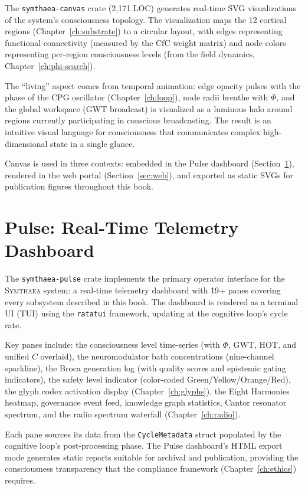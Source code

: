 \documentclass[12pt]{book}
\newcommand{\symthaea}{\textsc{Symthaea}}
\begin{document}
The \texttt{symthaea-canvas} crate (2,171 LOC) generates real-time SVG visualizations of the system's consciousness topology. The visualization maps the 12 cortical regions (Chapter~\ref{ch:substrate}) to a circular layout, with edges representing functional connectivity (measured by the CfC weight matrix) and node colors representing per-region consciousness levels (from the field dynamics, Chapter~\ref{ch:phi-search}).

The ``living'' aspect comes from temporal animation: edge opacity pulses with the phase of the CPG oscillator (Chapter~\ref{ch:loop}), node radii breathe with $\Phi$, and the global workspace (GWT broadcast) is visualized as a luminous halo around regions currently participating in conscious broadcasting. The result is an intuitive visual language for consciousness that communicates complex high-dimensional state in a single glance.

Canvas is used in three contexts: embedded in the Pulse dashboard (Section~\ref{sec:pulse}), rendered in the web portal (Section~\ref{sec:web}), and exported as static SVGs for publication figures throughout this book.

\section{Pulse: Real-Time Telemetry Dashboard}
\label{sec:pulse}

The \texttt{symthaea-pulse} crate implements the primary operator interface for the \symthaea{} system: a real-time telemetry dashboard with 19+ panes covering every subsystem described in this book. The dashboard is rendered as a terminal UI (TUI) using the \texttt{ratatui} framework, updating at the cognitive loop's cycle rate.

Key panes include: the consciousness level time-series (with $\Phi$, GWT, HOT, and unified $C$ overlaid), the neuromodulator bath concentrations (nine-channel sparkline), the Broca generation log (with quality scores and epistemic gating indicators), the safety level indicator (color-coded Green/Yellow/Orange/Red), the glyph codex activation display (Chapter~\ref{ch:glyphs}), the Eight Harmonies heatmap, governance event feed, knowledge graph statistics, Cantor resonator spectrum, and the radio spectrum waterfall (Chapter~\ref{ch:radio}).

Each pane sources its data from the \texttt{CycleMetadata} struct populated by the cognitive loop's post-processing phase. The Pulse dashboard's HTML export mode generates static reports suitable for archival and publication, providing the consciousness transparency that the compliance framework (Chapter~\ref{ch:ethics}) requires.
\end{document}
